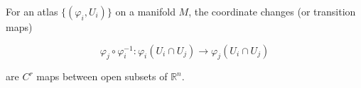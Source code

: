 For an atlas $\{(\varphi_i, U_i)\}$ on a manifold $M$, the coordinate changes (or transition maps)

$$\varphi_j \circ \varphi_i^{-1}: \varphi_i(U_i \cap U_j) \to \varphi_j(U_i \cap U_j)$$

are $C^r$ maps between open subsets of $\mathbb{R}^n$.
